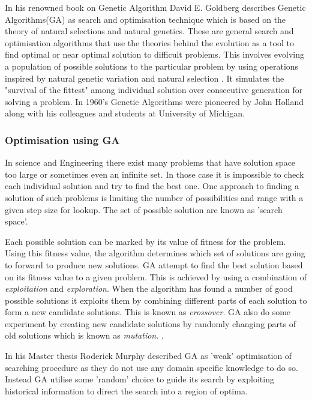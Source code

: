 \label{sga}
In his renowned book on Genetic Algorithm David E. Goldberg \citep{Goldberg:89} describes Genetic Algorithms(GA) as search and optimisation technique which is based on the theory of natural selections and natural genetics. These are general search and optimisation algorithms that use the theories behind the evolution as a tool to find optimal or near optimal solution to difficult problems. This involves evolving a population of possible solutions to the particular problem by using operations inspired by natural genetic variation and natural selection \citep{Murphy:03}. 
It simulates the "survival of the fittest" among individual solution over consecutive generation for solving a problem. In 1960's Genetic Algorithms were pioneered by John Holland along with his colleagues and students at University of Michigan\citep{Murphy:03}.

\subsubsection{Optimisation using GA}
In science and Engineering there exist many problems that have solution space too large or sometimes even an infinite set. In those case it is impossible to check each individual solution and try to find the best one. One approach to finding a solution of such problems is limiting the number of possibilities and range with a given step size for lookup. The set of possible solution are known as 'search space'. 

Each possible solution can be marked by its value of fitness for the problem.  Using this fitness value, the algorithm determines which set of solutions are going to forward to produce new solutions. GA attempt to find the best solution based on its fitness value to a given problem. This is achieved by using a combination of \emph{exploitation} and \emph{exploration}. When the algorithm has found a number of good possible solutions it exploits them by combining different parts of each solution to form a new candidate solutions. This is known as \emph{crossover}. GA also do some experiment by creating new candidate solutions by randomly changing parts of old solutions which is known as \emph{mutation}. \citep{Murphy:03}.

In his Master thesis Roderick Murphy described GA as 'weak' optimisation of searching procedure as they do not use any domain specific knowledge to do so\citep{Murphy:03}. Instead GA utilise some 'random' choice to guide its search by exploiting historical information to direct the search into a region of optima.
